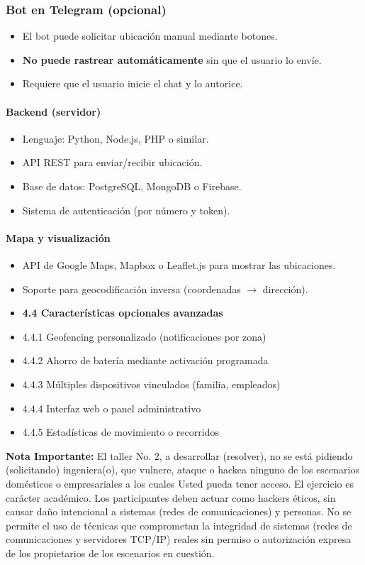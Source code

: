 \subsubsection{Bot en Telegram (opcional)}

\begin{itemize}
  \item El bot puede solicitar ubicación manual mediante botones.
  \item \textbf{No puede rastrear automáticamente} sin que el usuario lo envíe.
  \item \textbullet{} Requiere que el usuario inicie el chat y lo autorice.
\end{itemize}

\paragraph{Backend (servidor)}

\begin{itemize}
  \item Lenguaje: Python, Node.js, PHP o similar.
  \item API REST para enviar/recibir ubicación.
  \item Base de datos: PostgreSQL, MongoDB o Firebase.
  \item \textbullet{} Sistema de autenticación (por número y token).
\end{itemize}

\paragraph{Mapa y visualización}

\begin{itemize}
  \item API de Google Maps, Mapbox o Leaflet.js para mostrar las ubicaciones.
  \item Soporte para geocodificación inversa (coordenadas $\rightarrow$ dirección).
  \item \textbf{4.4 Características opcionales avanzadas}
  \item 4.4.1 Geofencing personalizado (notificaciones por zona)
  \item 4.4.2 Ahorro de batería mediante activación programada
  \item 4.4.3 Múltiples dispositivos vinculados (familia, empleados)
  \item 4.4.4 Interfaz web o panel administrativo
  \item 4.4.5 Estadísticas de movimiento o recorridos
\end{itemize}

\textbf{Nota Importante:} El taller No. 2, a desarrollar (resolver), no se está pidiendo (solicitando) ingeniera(o), que vulnere, ataque o hackea ninguno de los escenarios domésticos o empresariales a los cuales Usted pueda tener acceso. El ejercicio es carácter académico. Los participantes deben actuar como hackers éticos, sin causar daño intencional a sistemas (redes de comunicaciones) y personas. No se permite el uso de técnicas que comprometan la integridad de sistemas (redes de comunicaciones y servidores TCP/IP) reales sin permiso o autorización expresa de los propietarios de los escenarios en cuestión.
